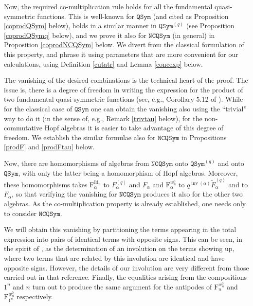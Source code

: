 \documentclass{article}
\theoremstyle{definition}
\begin{document}
Now, the required co-multiplication rule holds for all the fundamental quasi-symmetric functions. This is well-known for $\mathtt{QSym}$ (and cited as Proposition \ref{coprodQSym} below), holds in a similar manner in $\mathtt{QSym}^{(q)}$ (see Proposition \ref{coprodQSymq} below), and we prove it also for $\mathtt{NCQSym}$ (in general) in Proposition \ref{coprodNCQSym} below. We divert from the classical formulation of this property, and phrase it using parameters that are more convenient for our calculations, using Definition \ref{cutatr} and Lemma \ref{concexp} below.

\medskip

The vanishing of the desired combinations is the technical heart of the proof. The issue is, there is a degree of freedom in writing the expression for the product of two fundamental quasi-symmetric functions (see, e.g., Corollary 5.12 of \cite{[AsS]}). While for the classical case of $\mathtt{QSym}$ one can obtain the vanishing also using the ``trivial'' way to do it (in the sense of, e.g., Remark \ref{trivtau} below), for the non-commutative Hopf algebras it is easier to take advantage of this degree of freedom. We establish the similar formulae also for $\mathtt{NCQSym}$ in Propositions \ref{prodF} and \ref{prodFtau} below.

Now, there are homomorphisms of algebras from $\mathtt{NCQSym}$ onto $\mathtt{QSym}^{(q)}$ and onto $\mathtt{QSym}$, with only the latter being a homomorphism of Hopf algebras. Moreover, these homomorphisms takes $\mathrm{F}_{\alpha}^{\operatorname{Id}_{n}}$ to $F_{\alpha}^{(q)}$ and $F_{\alpha}$ and $\mathrm{F}_{\alpha}^{w^{0}_{n}}$ to $q^{\operatorname{inv}(\alpha)}\widetilde{F}_{\alpha}^{(q)}$ and to $F_{\alpha}$, so that verifying the vanishing for $\mathtt{NCQSym}$ produces it also for the other two algebras. As the co-multiplication property is already established, one needs only to consider $\mathtt{NCQSym}$.

We will obtain this vanishing by partitioning the terms appearing in the total expression into pairs of identical terms with opposite signs. This can be seen, in the spirit of \cite{[BS]}, as the determination of an involution on the terms showing up, where two terms that are related by this involution are identical and have opposite signs. However, the details of our involution are very different from those carried out in that reference. Finally, the equalities arising from the compositions $1^{n}$ and $n$ turn out to produce the same argument for the antipodes of $\mathrm{F}_{n}^{w^{0}_{n}}$ and $\mathrm{F}_{1^{n}}^{w^{0}_{n}}$ respectively.
\end{document}
